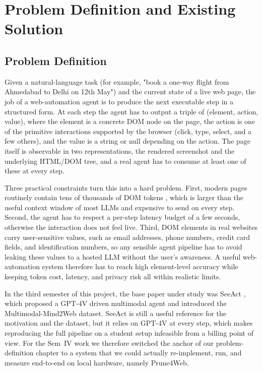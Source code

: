 \chapter{Problem Definition and Existing Solution}

\section{Problem Definition}
Given a natural-language task (for example, "book a one-way flight from Ahmedabad to Delhi on 12th May") and the current state of a live web page, the job of a web-automation agent is to produce the next executable step in a structured form. At each step the agent has to output a triple of (element, action, value), where the element is a concrete DOM node on the page, the action is one of the primitive interactions supported by the browser (click, type, select, and a few others), and the value is a string or null depending on the action. The page itself is observable in two representations, the rendered screenshot and the underlying HTML/DOM tree, and a real agent has to consume at least one of these at every step.

Three practical constraints turn this into a hard problem. First, modern pages routinely contain tens of thousands of DOM tokens \cite{zhang2025prune4web}, which is larger than the useful context window of most LLMs and expensive to send on every step. Second, the agent has to respect a per-step latency budget of a few seconds, otherwise the interaction does not feel live. Third, DOM elements in real websites carry user-sensitive values, such as email addresses, phone numbers, credit card fields, and identification numbers, so any sensible agent pipeline has to avoid leaking these values to a hosted LLM without the user's awareness. A useful web-automation system therefore has to reach high element-level accuracy while keeping token cost, latency, and privacy risk all within realistic limits.

In the third semester of this project, the base paper under study was SeeAct \cite{SeeAct}, which proposed a GPT-4V driven multimodal agent and introduced the Multimodal-Mind2Web dataset. SeeAct is still a useful reference for the motivation and the dataset, but it relies on GPT-4V at every step, which makes reproducing the full pipeline on a student setup infeasible from a billing point of view. For the Sem~IV work we therefore switched the anchor of our problem-definition chapter to a system that we could actually re-implement, run, and measure end-to-end on local hardware, namely Prune4Web.


